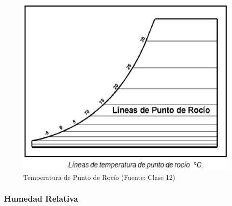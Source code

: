         \begin{multicols}{2}
            \begin{quote}
            \end{quote}
            
            \begin{figure}
                \includegraphics[width=\textwidth]{img/clases/temperatura_punto_rocio.png}
                \caption{Temperatura de Punto de Rocío (Fuente: Clase 12)}
                \label{fig:temperatura_punto_rocio}
            \end{figure}
        \end{multicols}
        \newpage
        
        \subsubsection{Humedad Relativa}
        
